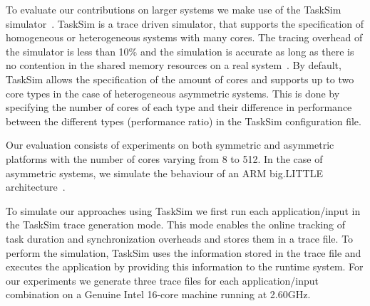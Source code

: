 
To evaluate our contributions on larger systems we make use of the TaskSim simulator~\cite{AbstrLevels_TACO12,MUSA}. 
TaskSim is a trace driven simulator, that supports the specification of homogeneous or heterogeneous systems with many cores. 
The tracing overhead of the simulator is less than 10\% and the simulation is accurate as long as there is no contention in the shared memory resources on a real system~\cite{MUSA}.
By default, TaskSim allows the specification of the amount of cores and supports up to two core types in the case of heterogeneous asymmetric systems. 
This is done by specifying the number of cores of each type and their difference in performance between the different types (performance ratio) in the TaskSim configuration file.

Our evaluation consists of experiments on both symmetric and asymmetric platforms with the number of cores varying from 8 to 512.
In the case of asymmetric systems, we simulate the behaviour of an ARM big.LITTLE architecture~\cite{ARM}.




To simulate our approaches using TaskSim we first run each application/input in the TaskSim trace generation mode.
This mode enables the online tracking of task duration and synchronization overheads and stores them in a trace file. 
To perform the simulation, TaskSim uses the information stored in the trace file and executes the application by providing this information to the runtime system.
For our experiments we generate three trace files for each application/input combination on a Genuine Intel 16-core machine running at 2.60GHz.
